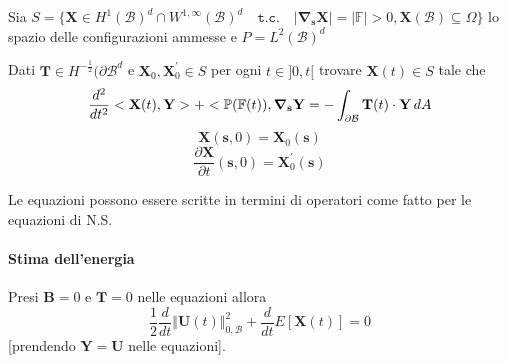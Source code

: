 Sia $S = \{ \mathbf{X} \in H^1(\mathcal{B})^d \cap W^{1,\infty}(\mathcal{B})^d \quad \texttt{t.c.} \quad \vert \boldsymbol {\nabla}_{\mathbf{s}}\mathbf{X}\vert = \vert \mathbb{F} \vert > 0, \mathbf{X}(\mathcal{B}) \subseteq \Omega \}$ lo spazio delle configurazioni ammesse e $P = L^2(\mathcal{B})^d$

Dati $\mathbf{T} \in H^{-\frac{1}{2}}(\partial\mathcal{B}^d$ e $\mathbf{X}_0,\mathbf{X}^{'}_0 \in S$ per ogni $t \in ]0,t[$ trovare $\mathbf{X}(t) \in S$ tale che 
$$\frac{d^2}{dt^2} < \mathbf{X}(t), \mathbf{Y} > + < \mathbb{P}(\mathbb{F}(t)), \boldsymbol{\nabla}_\mathbf{s} \mathbf{Y} = -\int_{\partial\mathcal{B}}\mathbf{T}(t)\cdot\mathbf{Y}\,dA$$
$$\mathbf{X}(\mathbf{s},0)=\mathbf{X}_0(\mathbf{s})$$
$$\frac{\partial\mathbf{X}}{\partial t}(\mathbf{s},0)=\mathbf{X}^{'}_0(\mathbf{s})$$

Le equazioni possono essere scritte in termini di operatori come fatto per le equazioni di N.S.

\paragraph{Stima dell'energia}

Presi $\mathbf{B}=0$ e $\mathbf{T}=0$ nelle equazioni allora
$$\frac{1}{2}\frac{d}{dt}\Vert\mathbf{U}(t)\Vert^2_{0,\mathcal{B}}+\frac{d}{dt}E[\mathbf{X}(t)]=0$$
[prendendo $\mathbf{Y}=\mathbf{U}$ nelle equazioni].

